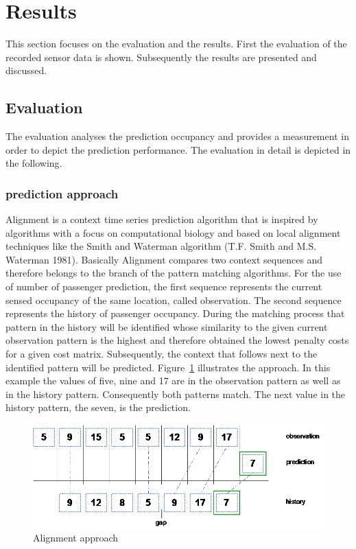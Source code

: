 \section{Results}
\label{sec:results}

This section focuses on the evaluation and the results. First the evaluation of the recorded sensor data is shown. Subsequently the results are presented and discussed.


\subsection{Evaluation}
\label{subsec:evaluation}

The evaluation analyses the prediction occupancy and provides a measurement in order to depict the prediction performance. The evaluation in detail is depicted in the following.


\subsubsection{prediction approach}
\label{subsubsec:predictionApproach}

Alignment is a context time series prediction algorithm that is inspired by algorithms with a focus on computational biology and based on local alignment techniques like the Smith and Waterman algorithm (T.F. Smith and M.S. Waterman 1981). Basically Alignment compares two context sequences and therefore belongs to the branch of the pattern matching algorithms. For the use of number of passenger prediction, the first sequence represents the current sensed occupancy of the same location, called observation. The second sequence represents the history of passenger occupancy.
During the matching process that pattern in the history will be identified whose similarity to the given current observation pattern is the highest and therefore obtained the lowest penalty costs for a given cost matrix. Subsequently, the context that follows next to the identified pattern will be predicted. Figure~\ref{fig:alignmentApproach} illustrates the approach. In this example the values of five, nine and 17 are in the observation pattern as well as in the history pattern. Consequently both patterns match. The next value in the history pattern, the seven, is the prediction.

\begin{figure}[htb]
  \centering
  \includegraphics[width=0.9\linewidth]{alignmentApproach.png} 
  \caption{Alignment approach}
  \label{fig:alignmentApproach}
\end{figure}

